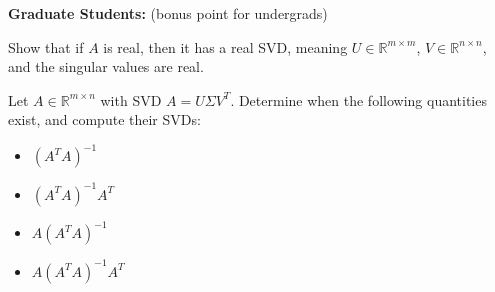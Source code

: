 \documentclass{ximera}
\begin{document}
\textbf{Graduate Students:} (bonus point for undergrads)


\begin{exercise}
    Show that if $A$ is real, then it has a real SVD, meaning $U \in \mathbb{R}^{m\times m}$, $V \in \mathbb{R}^{n\times n}$, and the singular values are real.
\end{exercise}

\begin{exercise}
    Let $A \in \mathbb{R}^{m\times n}$ with SVD $A= U\Sigma V^T$.  Determine when the following quantities exist, and compute their SVDs:
    \begin{itemize}
\item $(A^TA)^{-1}$
\item $(A^TA)^{-1}A^T$
\item $A(A^TA)^{-1}$
\item $A(A^TA)^{-1}A^T$
\end{itemize}
\end{exercise}
\end{document}
